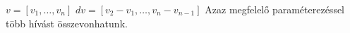 \href{https://www.mathworks.com/help/matlab/ref/diff.html}{}

 $v=[v_1,\hdots,v_n]$ \newline
{} $dv=[v_2-v_1,\hdots,v_n-v_{n-1}]$ \newline
{}
%
Azaz megfelelő paraméterezéssel több  hívást összevonhatunk.
